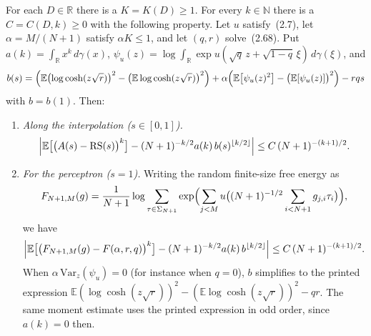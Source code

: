 \begin{theorem}\label{thm:sg-tal:perceptron-free-energy-clt}
  \leanok
For each $D\in\mathbb R$ there is a $K=K(D)\ge 1$. For every $k\in\mathbb N$ there is a $C=C(D,k)\ge 0$ with the
following property. Let $u$ satisfy~(2.7), let $\alpha=M/(N+1)$ satisfy $\alpha K\le 1$, and let $(q,r)$
solve~(2.68). Put $a(k)=\int_{\mathbb R}x^k\,d\gamma(x)$,
$\psi_u(z)=\log\int_{\mathbb R}\exp u(\sqrt q\,z+\sqrt{1-q}\,\xi)\,d\gamma(\xi)$, and
\[
 b(s)=\Bigl(\mathbb E\bigl(\log\cosh(z\sqrt r)\bigr)^2-\bigl(\mathbb E\log\cosh(z\sqrt r)\bigr)^2\Bigr)
   +\alpha\Bigl(\mathbb E\bigl[\psi_u(z)^2\bigr]-\bigl(\mathbb E[\psi_u(z)]\bigr)^2\Bigr)-rqs
\]
with $b=b(1)$. Then:
\begin{enumerate}
\item \emph{Along the interpolation ($s\in[0,1]$).}
\[
 \Bigl|\mathbb E\bigl[\bigl(A(s)-\mathrm{RS}(s)\bigr)^k\bigr]-(N+1)^{-k/2}a(k)\,b(s)^{\lfloor k/2\rfloor}\Bigr|
 \le C\,(N+1)^{-(k+1)/2}.
\]
\item \emph{For the perceptron ($s=1$).} Writing the random finite-size free energy as
\[
 F_{N+1,M}(g)=\frac{1}{N+1}\log\sum_{\tau\in\Sigma_{N+1}}
   \exp\Bigl(\sum_{j<M}u\bigl((N+1)^{-1/2}\sum_{i<N+1}g_{j,i}\tau_i\bigr)\Bigr),
\]
we have
\[
 \Bigl|\mathbb E\bigl[\bigl(F_{N+1,M}(g)-F(\alpha,r,q)\bigr)^k\bigr]-(N+1)^{-k/2}a(k)\,b^{\lfloor k/2\rfloor}\Bigr|
 \le C\,(N+1)^{-(k+1)/2}.
\]
When $\alpha\,\mathrm{Var}_z(\psi_u)=0$ (for instance when $q=0$), $b$ simplifies to the printed expression
$\mathbb E(\log\cosh(z\sqrt r))^2-(\mathbb E\log\cosh(z\sqrt r))^2-qr$.
The same moment estimate uses the printed expression in odd order, since $a(k)=0$ then.
\end{enumerate}
\end{theorem}
